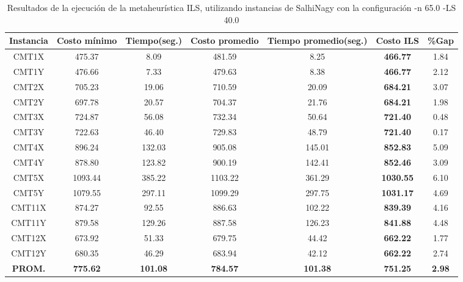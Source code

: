 \begin{table}[ht]
\caption{Resultados de la ejecución de la metaheurística ILS, utilizando instancias de SalhiNagy con la configuración -n 65.0 -LS 40.0}
\centering
\small
\begin{tabular}{c c c c c c c}
\hline\hline
Instancia & Costo mínimo & Tiempo(seg.) & Costo promedio & Tiempo promedio(seg.) & Costo ILS & \%Gap \\ [0.5ex]
\hline
CMT1X & 475.37 & 8.09 & 
481.59 & 8.25 & \bf{466.77} & 
1.84\\CMT1Y & 476.66 & 7.33 & 
479.63 & 8.38 & \bf{466.77} & 
2.12\\CMT2X & 705.23 & 19.06 & 
710.59 & 20.09 & \bf{684.21} & 
3.07\\CMT2Y & 697.78 & 20.57 & 
704.37 & 21.76 & \bf{684.21} & 
1.98\\CMT3X & 724.87 & 56.08 & 
732.34 & 50.64 & \bf{721.40} & 
0.48\\CMT3Y & 722.63 & 46.40 & 
729.83 & 48.79 & \bf{721.40} & 
0.17\\CMT4X & 896.24 & 132.03 & 
905.08 & 145.01 & \bf{852.83} & 
5.09\\CMT4Y & 878.80 & 123.82 & 
900.19 & 142.41 & \bf{852.46} & 
3.09\\CMT5X & 1093.44 & 385.22 & 
1103.22 & 361.29 & \bf{1030.55} & 
6.10\\CMT5Y & 1079.55 & 297.11 & 
1099.29 & 297.75 & \bf{1031.17} & 
4.69\\CMT11X & 874.27 & 92.55 & 
886.63 & 102.22 & \bf{839.39} & 
4.16\\CMT11Y & 879.58 & 129.26 & 
887.58 & 126.23 & \bf{841.88} & 
4.48\\CMT12X & 673.92 & 51.33 & 
679.75 & 44.42 & \bf{662.22} & 
1.77\\CMT12Y & 680.35 & 46.29 & 
683.94 & 42.12 & \bf{662.22} & 
2.74\\\bf{PROM.} & 
\bf{775.62} & \bf{101.08} & \bf{784.57} & \bf{101.38} & \bf{751.25} & \bf{2.98}\\[1ex]\hline
\end{tabular}
\label{table:nonlin}
\end{table} \clearpage
